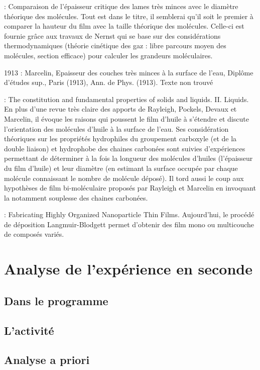\documentclass[12pt,a4paper]{article}
\begin{document}
\cite{Devaux1904} : Comparaison de l'épaisseur critique des lames très minces avec le diamètre théorique des molécules.
Tout est dans le titre, il semblerai qu'il soit le premier à comparer la hauteur du film avec la taille théorique des molécules.
Celle-ci est fournie grâce aux travaux de Nernst qui se base sur des considérations thermodynamiques (théorie cinétique des gaz : libre parcours moyen des molécules, section efficace) pour calculer les grandeurs moléculaires.

1913 : Marcelin, Epaisseur des couches très minces à la surface de l'eau, Diplôme d'études sup., Paris (1913), Ann. de Phys. (1913). Texte non trouvé

\cite{Langmuir1917} : The constitution and fundamental properties of solids and liquids. II. Liquids.
En plus d'une revue très claire des apports de Rayleigh, Pockels, Devaux et Marcelin, il évoque les raisons qui poussent le film d'huile à s'étendre et discute l'orientation des molécules d'huile à la surface de l'eau.
Ses considération théoriques sur les propriétés hydrophiles du groupement carboxyle (et de la double liaison) et hydrophobe des chaines carbonées sont suivies d'expériences permettant de déterminer à la fois la longueur des molécules d'huiles (l'épaisseur du film d'huile) et leur diamètre (en estimant la surface occupée par chaque molécule connaissant le nombre de molécule déposé).
Il tord aussi le coup aux hypothèses de film bi-moléculaire proposés par Rayleigh et Marcelin en invoquant la notamment souplesse des chaines carbonées.

\cite{BiolinScientific2011} : Fabricating Highly Organized Nanoparticle Thin Films.
Aujourd'hui, le procédé de déposition Langmuir-Blodgett permet d'obtenir des film mono ou multicouche de composés variés.

\section{Analyse de l'expérience en seconde}

\subsection{Dans le programme}

\subsection{L'activité}

\subsection{Analyse a priori}
\end{document}
